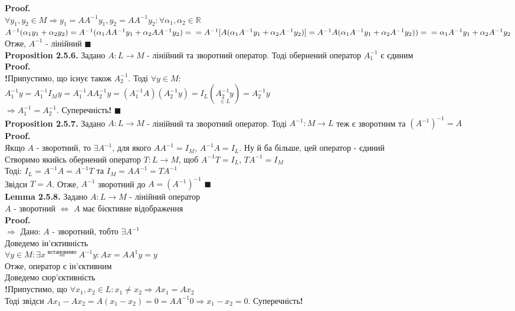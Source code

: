 \documentclass[a4paper, 14pt]{extarticle}
\def\prp#1{\textbf{Proposition {#1}}}
\def\lm#1{\textbf{Lemma {#1}}}
\def\proof{\textbf{Proof.}\\}
\def\bigline{\vspace{5mm}\\}
\def\qed{$\blacksquare$}
\begin{document}
	\proof
	$\forall y_1, y_2 \in M \Rightarrow y_1 = AA^{-1}y_1, y_2 = AA^{-1}y_2: \forall \alpha_1, \alpha_2 \in \mathbb{R}$\\
	$A^{-1}(\alpha_1 y_1 + \alpha_2 y_2) = A^{-1}(\alpha_1 AA^{-1}y_1 + \alpha_2 AA^{-1}y_2) = \\ = A^{-1}[A(\alpha_1 A^{-1}y_1 + \alpha_2 A^{-1}y_2)] = A^{-1}A(\alpha_1 A^{-1}y_1 + \alpha_2 A^{-1}y_2)) = \\ = \alpha_1 A^{-1}y_1 + \alpha_2 A^{-1}y_2$\\
	Отже, $A^{-1}$ - лінійний \qed
	\bigline
	\prp{2.5.6.} Задано $A: L \to M$ - лінійний та зворотний оператор. Тоді обернений оператор $A^{-1}_1$ є єдиним\\
	\proof
	\textbf{!}Припустимо, що існує також $A^{-1}_2$. Тоді $\forall y \in M:$\\
	$A^{-1}_1 y = A^{-1}_1 I_M y = A^{-1}_1 A A^{-1}_2 y = (A^{-1}_1 A) (A^{-1}_2 y) = I_L (\underset{\in L}{A^{-1}_2 y}) = A_2^{-1}y$\\
	$\Rightarrow A^{-1}_1 = A^{-1}_2$. Суперечність\textbf{!}
	\qed
	\bigline
	\prp{2.5.7.} Задано $A: L \to M$ - лінійний та зворотний оператор. Тоді $A^{-1}: M \to L$ теж є зворотним та $(A^{-1})^{-1} = A$\\
	\proof
	Якщо $A$ - зворотний, то $\exists A^{-1}$, для якого $AA^{-1} = I_M$, $A^{-1}A = I_L$. Ну й ба більше, цей оператор - єдиний\\
	Створимо якийсь обернений оператор $T: L \to M$, щоб $A^{-1}T = I_L$, $TA^{-1} = I_M$\\
	Тоді: $I_L = A^{-1}A = A^{-1}T$ та $I_M = AA^{-1} = TA^{-1}$\\
	Звідси $T = A$. Отже, $A^{-1}$ зворотний до $A = (A^{-1})^{-1}$ \qed
	\bigline
	\lm{2.5.8.} Задано $A: L \to M$ - лінійний оператор\\
	$A$ - зворотний $\iff$ $A$ має бієктивне відображення\\
	\proof
	$\boxed{\Rightarrow}$ Дано: $A$ - зворотний, тобто $\exists A^{-1}$\\
	Доведемо ін'єктивність\\
	$\forall y \in M: \exists x \overset{\textrm{встановимо}}{=} A^{-1}y: Ax = AA^{1}y = y$\\
	Отже, оператор є ін'єктивним\\
	Доведемо сюр'єктивність\\
	\textbf{!}Припустимо, що $\forall x_1,x_2 \in L: x_1 \neq x_2 \Rightarrow Ax_1 = Ax_2$\\
	Тоді звідси $Ax_1 - Ax_2 = A(x_1-x_2)=0=AA^{-1}0 \Rightarrow x_1 - x_2 = 0$. Суперечність\textbf{!} \\
\end{document}
